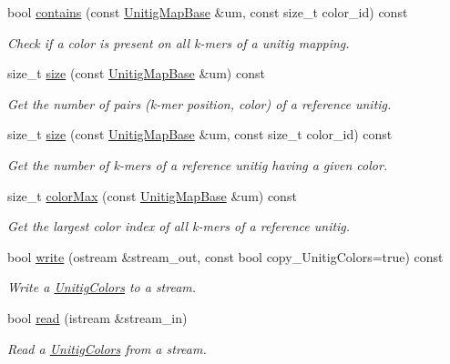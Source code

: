 \begin{DoxyCompactItemize}
bool \hyperlink{classUnitigColors_a80198f26ea0b2d7c6c0378779c8e1810}{contains} (const \hyperlink{structUnitigMapBase}{Unitig\+Map\+Base} \&um, const size\+\_\+t color\+\_\+id) const
\begin{DoxyCompactList}\small\item\em Check if a color is present on all k-\/mers of a unitig mapping. \end{DoxyCompactList}\item 
size\+\_\+t \hyperlink{classUnitigColors_ad410a06bb105a496951c805c69d65f5f}{size} (const \hyperlink{structUnitigMapBase}{Unitig\+Map\+Base} \&um) const
\begin{DoxyCompactList}\small\item\em Get the number of pairs (k-\/mer position, color) of a reference unitig. \end{DoxyCompactList}\item 
size\+\_\+t \hyperlink{classUnitigColors_a354c6f26708ddbd2223f1f58d695dc32}{size} (const \hyperlink{structUnitigMapBase}{Unitig\+Map\+Base} \&um, const size\+\_\+t color\+\_\+id) const
\begin{DoxyCompactList}\small\item\em Get the number of k-\/mers of a reference unitig having a given color. \end{DoxyCompactList}\item 
size\+\_\+t \hyperlink{classUnitigColors_aa68c4fe9877305f2db67cb998aabe6b6}{color\+Max} (const \hyperlink{structUnitigMapBase}{Unitig\+Map\+Base} \&um) const
\begin{DoxyCompactList}\small\item\em Get the largest color index of all k-\/mers of a reference unitig. \end{DoxyCompactList}\item 
bool \hyperlink{classUnitigColors_adbd2e7d19983b0fc1d4b7a7a65f74689}{write} (ostream \&stream\+\_\+out, const bool copy\+\_\+\+Unitig\+Colors=true) const
\begin{DoxyCompactList}\small\item\em Write a \hyperlink{classUnitigColors}{Unitig\+Colors} to a stream. \end{DoxyCompactList}\item 
bool \hyperlink{classUnitigColors_a6bc79eb9e7c5b94dfbf8235033d32af5}{read} (istream \&stream\+\_\+in)
\begin{DoxyCompactList}\small\item\em Read a \hyperlink{classUnitigColors}{Unitig\+Colors} from a stream. \end{DoxyCompactList}\item 

\end{DoxyCompactItemize}
